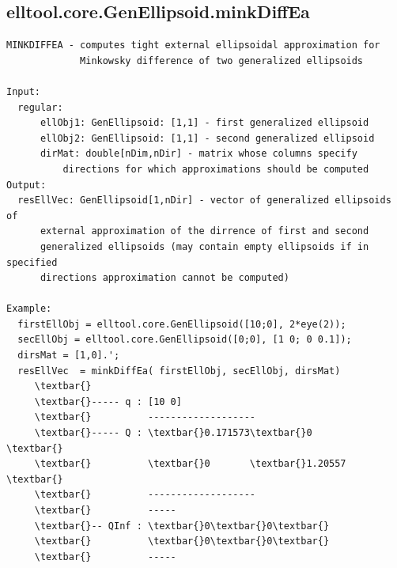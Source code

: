 \documentclass[letterpaper,10pt,english]{sphinxmanual}
\begin{document}
\subsection{elltool.core.GenEllipsoid.minkDiffEa}
\label{chap_functions:elltool-core-genellipsoid-minkdiffea}
\begin{Verbatim}[commandchars=\\\{\}]
MINKDIFFEA - computes tight external ellipsoidal approximation for
             Minkowsky difference of two generalized ellipsoids

Input:
  regular:
      ellObj1: GenEllipsoid: [1,1] - first generalized ellipsoid
      ellObj2: GenEllipsoid: [1,1] - second generalized ellipsoid
      dirMat: double[nDim,nDir] - matrix whose columns specify
          directions for which approximations should be computed
Output:
  resEllVec: GenEllipsoid[1,nDir] - vector of generalized ellipsoids of
      external approximation of the dirrence of first and second
      generalized ellipsoids (may contain empty ellipsoids if in specified
      directions approximation cannot be computed)

Example:
  firstEllObj = elltool.core.GenEllipsoid([10;0], 2*eye(2));
  secEllObj = elltool.core.GenEllipsoid([0;0], [1 0; 0 0.1]);
  dirsMat = [1,0].';
  resEllVec  = minkDiffEa( firstEllObj, secEllObj, dirsMat)
     \textbar{}
     \textbar{}----- q : [10 0]
     \textbar{}          -------------------
     \textbar{}----- Q : \textbar{}0.171573\textbar{}0       \textbar{}
     \textbar{}          \textbar{}0       \textbar{}1.20557 \textbar{}
     \textbar{}          -------------------
     \textbar{}          -----
     \textbar{}-- QInf : \textbar{}0\textbar{}0\textbar{}
     \textbar{}          \textbar{}0\textbar{}0\textbar{}
     \textbar{}          -----
\end{Verbatim}
\end{document}
